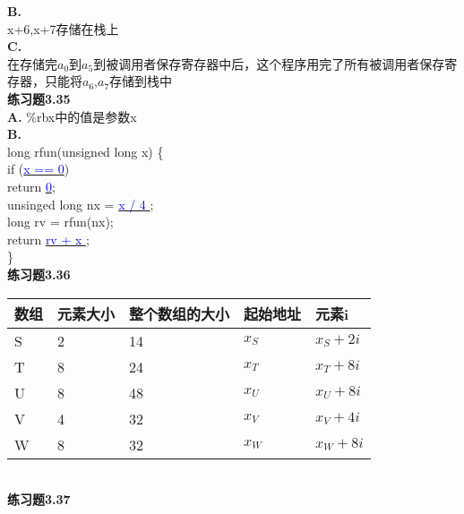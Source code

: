 \documentclass{article}
\newcommand{\blue}[1]{\textcolor{blue}{#1}}
\begin{document}
\begin{CJK}{UTF8}{uyhei}
\textbf{B.}	\\
x+6,x+7存储在栈上	\\
\textbf{C.}	\\
在存储完$a_0$到$a_5$到被调用者保存寄存器中后，这个程序用完了所有被调用者保存寄存器，只能将$a_6$,$a_7$存储到栈中	\\[3ex]
\textbf{练习题3.35}	\\
\textbf{A.} \%rbx中的值是参数x	\\
\textbf{B.}	\\
long rfun(unsigned long x) \{	\\
	\hspace*{2em}if (\underline{\blue{x == 0}})	\\
	\hspace*{4em}return {\underline{\blue{0}}};	\\
		\hspace*{2em}unsinged long nx = \underline{\blue{ x / 4 }};	\\
		\hspace*{2em}long rv = rfun(nx);	\\
		\hspace*{2em}return \underline{\blue{ rv + x }};	\\
\noindent\}	\\[2em]
\textbf{练习题3.36}	\\
\renewcommand\arraystretch{1.4}
\begin{table}[htbp]
\centering
\begin{tabular}{|m{6em}<{\centering}|m{6em}<{\centering}|m{12em}<{\centering}|m{6em}<{\centering}|m{12em}<{\centering}|}
\hline
数组	&	元素大小	&	整个数组的大小	&	起始地址	&	元素i	\\
\hline
S	&	2		&	14		&	$x_S$		&	$x_S+2i$	\\
\hline
T	&	8		&	24		&	$x_T$		&	$x_T+8i$	\\
\hline
U	&	8		&	48		&	$x_U$		&	$x_U+8i$	\\
\hline
V	&	4		&	32		&	$x_V$		&	$x_V+4i$	\\
\hline
W	&	8		&	32		&	$x_W$		&	$x_W+8i$	\\
\hline
\end{tabular}
\end{table}	\\[2ex]
\textbf{练习题3.37}	\\
\renewcommand\arraystretch{1.4}
\begin{table}[htbp]
\centering
\begin{tabular}{|m{12em}<{\centering}|m{12em}<{\centering}|m{12em}<{\centering}|m{14em}<{\centering}|}

\end{tabular}
\end{table}
\end{CJK}
\end{document}

